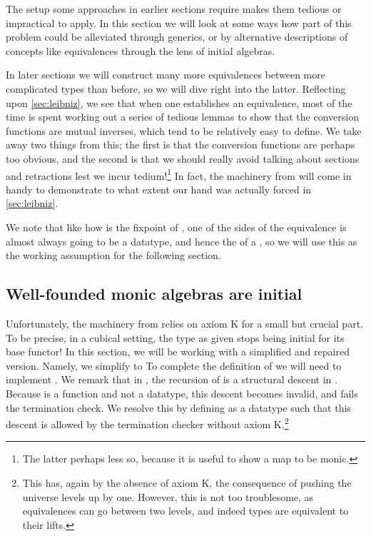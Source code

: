 The setup some approaches in earlier sections require makes them tedious or impractical to apply. In this section we will look at some ways how part of this problem could be alleviated through generics, or by alternative descriptions of concepts like equivalences through the lens of initial algebras. 

In later sections we will construct many more equivalences between more complicated types than before, so we will dive right into the latter. Reflecting upon \autoref{sec:leibniz}, we see that when one establishes an equivalence, most of the time is spent working out a series of tedious lemmas to show that the conversion functions are mutual inverses, which tend to be relatively easy to define. We take away two things from this; the first is that the conversion functions are perhaps too obvious, and the second is that we should really avoid talking about sections and retractions lest we incur tedium!\footnote{The latter perhaps less so, because it is useful to show a map to be monic.} In fact, the machinery from \cite{progorn} will come in handy to demonstrate to what extent our hand was actually forced in \autoref{sec:leibniz}.

We note that like how \bN{} is the fixpoint of , one of the sides of the equivalence is almost always going to be a datatype, and hence the  of a , so we will use this as the working assumption for the following section.

\subsection{Well-founded monic algebras are initial}\label{ssec:wellfounded}
Unfortunately, the machinery from \cite{progorn} relies on axiom K for a small but crucial part. To be precise, in a cubical setting, the type  as given stops being initial for its base functor! In this section, we will be working with a simplified and repaired version. Namely, we simplify  to 
To complete the definition of 
we will need to implement . We remark that in \cite{progorn}, the recursion of  is a structural descent in . Because  is a function and not a datatype, this descent becomes invalid, and  fails the termination check. We resolve this by defining  as a datatype
such that this descent is allowed by the termination checker without axiom K.\footnote{This has, again by the absence of axiom K, the consequence of pushing the universe levels up by one. However, this is not too troublesome, as equivalences can go between two levels, and indeed types are equivalent to their lifts.}

